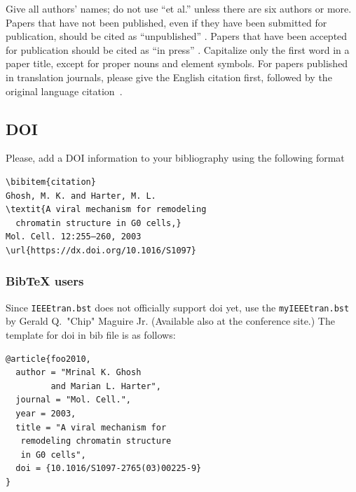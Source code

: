 \documentclass[conference]{IEEEtran}
\begin{document}
Give all authors' names; do not use ``et al.'' unless there are six authors or more.  Papers that have not been published, even if they have been submitted for publication, should be cited as ``unpublished'' \cite{cu}.  Papers that have been accepted for publication should be cited as ``in press'' \cite{cin}.  Capitalize only the first word in a paper title, except for proper nouns and element symbols.
For papers published in translation journals, please give the English citation first, followed by the original language citation~\cite{ctr}.

\subsection{DOI}
Please, add a DOI information to your bibliography using the following format
\begin{verbatim}
\bibitem{citation}
Ghosh, M. K. and Harter, M. L.
\textit{A viral mechanism for remodeling 
  chromatin structure in G0 cells,} 
Mol. Cell. 12:255–260, 2003 
\url{https://dx.doi.org/10.1016/S1097}
\end{verbatim}


\subsubsection*{BibTeX users}
Since \verb|IEEEtran.bst| does not officially support doi yet, use the \verb|myIEEEtran.bst| by Gerald Q.~"Chip" Maguire Jr. (Available also at the conference site.) The template for doi in bib file is as follows:
\begin{verbatim}
@article{foo2010,
  author = "Mrinal K. Ghosh 
         and Marian L. Harter",
  journal = "Mol. Cell.",
  year = 2003,
  title = "A viral mechanism for 
   remodeling chromatin structure 
   in G0 cells",
  doi = {10.1016/S1097-2765(03)00225-9}
}
\end{verbatim}
\end{document}
